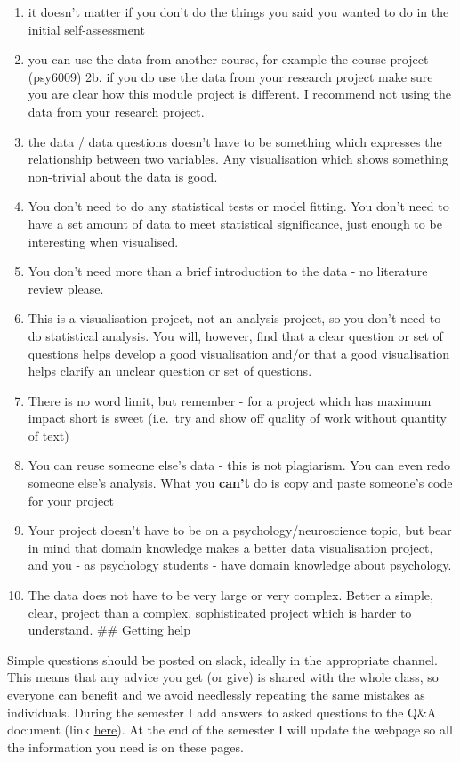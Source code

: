 \documentclass[
]{book}
\providecommand{\tightlist}{%
  \setlength{\itemsep}{0pt}\setlength{\parskip}{0pt}}
\begin{document}
\begin{enumerate}
\def\labelenumi{\arabic{enumi}.}
\tightlist
\item
  it doesn't matter if you don't do the things you said you wanted to do in the initial self-assessment
\item
  you can use the data from another course, for example the course project (psy6009)
  2b. if you do use the data from your research project make sure you are clear how this module project is different. I recommend not using the data from your research project.
\item
  the data / data questions doesn't have to be something which expresses the relationship between two variables. Any visualisation which shows something non-trivial about the data is good.
\item
  You don't need to do any statistical tests or model fitting. You don't need to have a set amount of data to meet statistical significance, just enough to be interesting when visualised.
\item
  You don't need more than a brief introduction to the data - no literature review please.
\item
  This is a visualisation project, not an analysis project, so you don't need to do statistical analysis. You will, however, find that a clear question or set of questions helps develop a good visualisation and/or that a good visualisation helps clarify an unclear question or set of questions.
\item
  There is no word limit, but remember - for a project which has maximum impact short is sweet (i.e.~try and show off quality of work without quantity of text)
\item
  You can reuse someone else's data - this is not plagiarism. You can even redo someone else's analysis. What you \textbf{can't} do is copy and paste someone's code for your project
\item
  Your project doesn't have to be on a psychology/neuroscience topic, but bear in mind that domain knowledge makes a better data visualisation project, and you - as psychology students - have domain knowledge about psychology.
\item
  The data does not have to be very large or very complex. Better a simple, clear, project than a complex, sophisticated project which is harder to understand.
  \#\# Getting help
\end{enumerate}

Simple questions should be posted on slack, ideally in the appropriate channel. This means that any advice you get (or give) is shared with the whole class, so everyone can benefit and we avoid needlessly repeating the same mistakes as individuals. During the semester I add answers to asked questions to the Q\&A document (link \href{index.html}{here}). At the end of the semester I will update the webpage so all the information you need is on these pages.
\end{document}
